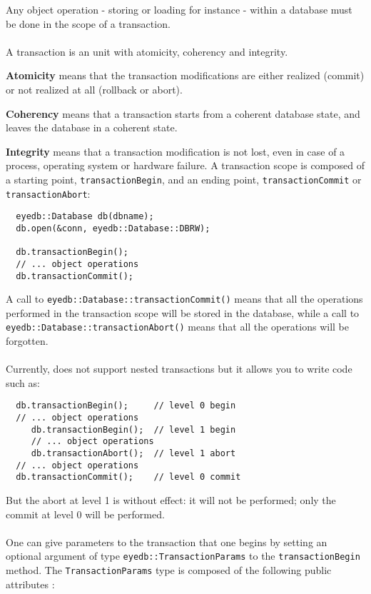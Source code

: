 \normalsize
{}
Any object operation - storing or loading for instance -
within a database must be done in the scope of a transaction.
\\
\\
A transaction is an unit with atomicity, coherency and integrity.
\be
\item {\bf Atomicity} means that the transaction modifications are either
realized (commit) or not realized at all (rollback or abort).
\item {\bf Coherency} means that a transaction starts from a coherent database
state, and leaves the database in a coherent state.
\item {\bf Integrity} means that a transaction modification is not lost, even
in case of a process, operating system or hardware failure.
\ee
A transaction scope is composed of a starting point, \texttt{transactionBegin},
and an ending point, \texttt{transactionCommit} or \texttt{transactionAbort}:
\verbsize
\begin{verbatim}
  eyedb::Database db(dbname);
  db.open(&conn, eyedb::Database::DBRW);

  db.transactionBegin();
  // ... object operations
  db.transactionCommit();
\end{verbatim}
\normalsize
A call to \texttt{eyedb::Database::transactionCommit()} means that all the
operations performed in the transaction scope will be stored in
the database, while a call to \texttt{eyedb::Database::transactionAbort()} means
that all the operations will be forgotten.
\\
\\
Currently, \eyedb does not support nested transactions but it allows you
to write code such as:
\verbsize
\begin{verbatim}
  db.transactionBegin();     // level 0 begin
  // ... object operations
     db.transactionBegin();  // level 1 begin
     // ... object operations
     db.transactionAbort();  // level 1 abort
  // ... object operations
  db.transactionCommit();    // level 0 commit
\end{verbatim}
\normalsize
But the abort at level 1 is without effect: it will
not be performed; only the commit at level 0 will be performed.
\\
\\
One can give parameters to the transaction that one begins by setting an
optional argument of type \texttt{eyedb::TransactionParams} to the
\texttt{transactionBegin} method. The \texttt{TransactionParams} type is
composed of the following public attributes :
